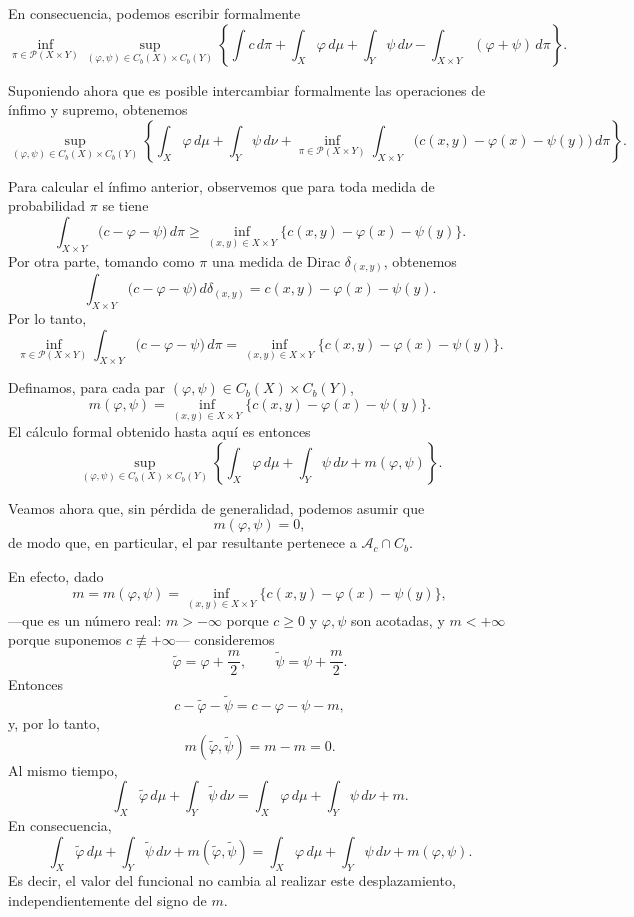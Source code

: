 \documentclass[12pt, a4paper]{amsbook}
\theoremstyle{remark}
\theoremstyle{definition}
\numberwithin{section}{chapter}
\numberwithin{subsection}{section}
\numberwithin{equation}{section}
\numberwithin{figure}{chapter}
\begin{document}
En consecuencia, podemos escribir formalmente
\[
\inf_{\pi\in\mathcal P(X\times Y)}
\sup_{(\varphi,\psi)\in C_b(X)\times C_b(Y)}
\left\{
\int c\,d\pi
+
\int_X\varphi\,d\mu
+
\int_Y\psi\,d\nu
-
\int_{X\times Y}
(\varphi+\psi)\,d\pi
\right\}.
\]

Suponiendo ahora que es posible intercambiar formalmente las operaciones de
ínfimo y supremo, obtenemos
\[
\sup_{(\varphi,\psi)\in C_b(X)\times C_b(Y)}
\left\{
\int_X\varphi\,d\mu
+
\int_Y\psi\,d\nu
+
\inf_{\pi\in\mathcal P(X\times Y)}
\int_{X\times Y}
\bigl(c(x,y)-\varphi(x)-\psi(y)\bigr)
\,d\pi
\right\}.
\]

Para calcular el ínfimo anterior, observemos que para toda medida de
probabilidad $\pi$ se tiene
\[
\int_{X\times Y}
\bigl(c-\varphi-\psi\bigr)\,d\pi
\geq
\inf_{(x,y)\in X\times Y}
\bigl\{c(x,y)-\varphi(x)-\psi(y)\bigr\}.
\]
Por otra parte, tomando como $\pi$ una medida de Dirac
$\delta_{(x,y)}$, obtenemos
\[
\int_{X\times Y}
\bigl(c-\varphi-\psi\bigr)\,d\delta_{(x,y)}
=
c(x,y)-\varphi(x)-\psi(y).
\]
Por lo tanto,
\[
\inf_{\pi\in\mathcal P(X\times Y)}
\int_{X\times Y}
\bigl(c-\varphi-\psi\bigr)\,d\pi
=
\inf_{(x,y)\in X\times Y}
\bigl\{c(x,y)-\varphi(x)-\psi(y)\bigr\}.
\]

Definamos, para cada par
$(\varphi,\psi)\in C_b(X)\times C_b(Y)$,
\[
m(\varphi,\psi)
=
\inf_{(x,y)\in X\times Y}
\bigl\{
c(x,y)-\varphi(x)-\psi(y)
\bigr\}.
\]
El cálculo formal obtenido hasta aquí es entonces
\[
\sup_{(\varphi,\psi)\in C_b(X)\times C_b(Y)}
\left\{
\int_X\varphi\,d\mu
+
\int_Y\psi\,d\nu
+
m(\varphi,\psi)
\right\}.
\]

Veamos ahora que, sin pérdida de generalidad, podemos asumir que
\[
m(\varphi,\psi)=0,
\]
de modo que, en particular, el par resultante pertenece a $\mathcal A_c\cap C_b$.

En efecto, dado
\[
m=m(\varphi,\psi)
=
\inf_{(x,y)\in X\times Y}
\{c(x,y)-\varphi(x)-\psi(y)\},
\]
—que es un número real: $m>-\infty$ porque $c\ge0$ y $\varphi,\psi$ son
acotadas, y $m<+\infty$ porque suponemos $c\not\equiv+\infty$—
consideremos
\[
\widetilde\varphi=\varphi+\frac m2,
\qquad
\widetilde\psi=\psi+\frac m2.
\]
Entonces
\[
c-\widetilde\varphi-\widetilde\psi
=
c-\varphi-\psi-m,
\]
y, por lo tanto,
\[
m(\widetilde\varphi,\widetilde\psi)
=
m-m=0.
\]
Al mismo tiempo,
\[
\int_X\widetilde\varphi\,d\mu
+
\int_Y\widetilde\psi\,d\nu
=
\int_X\varphi\,d\mu
+
\int_Y\psi\,d\nu+m.
\]
En consecuencia,
\[
\int_X\widetilde\varphi\,d\mu
+
\int_Y\widetilde\psi\,d\nu
+
m(\widetilde\varphi,\widetilde\psi)
=
\int_X\varphi\,d\mu
+
\int_Y\psi\,d\nu
+
m(\varphi,\psi).
\]
Es decir, el valor del funcional no cambia al realizar este desplazamiento,
independientemente del signo de $m$.
\end{document}
